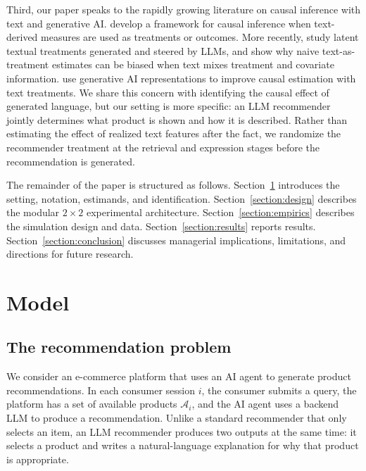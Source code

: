 \documentclass[11pt]{article}
\newcommand{\catalog}{\mathcal{A}}
\begin{document}
Third, our paper speaks to the rapidly growing literature on causal inference with text and generative AI. \citet{egami2022causal} develop a framework for causal inference when text-derived measures are used as treatments or outcomes. More recently, \citet{feldman2026latent} study latent textual treatments generated and steered by LLMs, and show why naive text-as-treatment estimates can be biased when text mixes treatment and covariate information. \citet{imai2024causal} use generative AI representations to improve causal estimation with text treatments. We share this concern with identifying the causal effect of generated language, but our setting is more specific: an LLM recommender jointly determines what product is shown and how it is described. Rather than estimating the effect of realized text features after the fact, we randomize the recommender treatment at the retrieval and expression stages before the recommendation is generated.

The remainder of the paper is structured as follows. Section~\ref{section:model} introduces the setting, notation, estimands, and identification. Section~\ref{section:design} describes the modular $2 \times 2$ experimental architecture. Section~\ref{section:empirics} describes the simulation design and data. Section~\ref{section:results} reports results. Section~\ref{section:conclusion} discusses managerial implications, limitations, and directions for future research.

\section{Model}\label{section:model}

\subsection{The recommendation problem}

We consider an e-commerce platform that uses an AI agent to generate product recommendations. In each consumer session $i$, the consumer submits a query, the platform has a set of available products $\catalog_i$, and the AI agent uses a backend LLM to produce a recommendation. Unlike a standard recommender that only selects an item, an LLM recommender produces two outputs at the same time: it selects a product and writes a natural-language explanation for why that product is appropriate.
\end{document}
